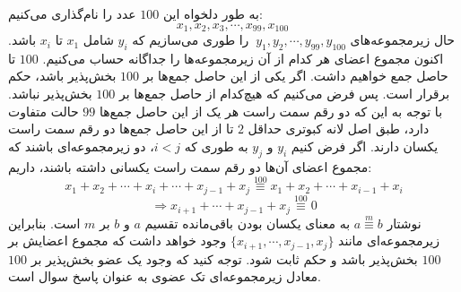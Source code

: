 \p
به طور دلخواه این 
$100$
 عدد را نام‌گذاری می‌کنیم:
$$x_1, x_2, x_3, \cdots, x_{99}, x_{100}\:$$
 حال زیرمجموعه‌های 
$\:y_1, y_2, \cdots, y_{99}, y_{100}$
 را طوری می‌سازیم که 
$y_i$
 شامل 
$x_1$
 تا
$x_i$
 باشد. اکنون مجموع اعضای هر کدام از آن زیرمجموعه‌ها را جداگانه حساب می‌کنیم.
 $100$
 تا حاصل جمع خواهیم داشت. اگر یکی از این حاصل جمع‌ها بر 
 $100$
 بخش‌پذیر باشد، حکم برقرار است. پس فرض می‌کنیم که هیچ‌کدام از حاصل جمع‌ها بر 
 $100$
 بخش‌پذیر نباشد. با توجه به این که دو رقم سمت راست هر یک از این حاصل جمع‌ها
 $99$
حالت متفاوت دارد، طبق اصل لانه کبوتری حداقل 
$2$
 تا از این  حاصل جمع‌ها دو رقم سمت راست یکسان دارند. اگر فرض کنیم
 $y_i$
 و
 $y_j$
 به طوری که
 $i < j$،
دو زیرمجموعه‌ای باشند که مجموع اعضای آن‌ها دو رقم سمت راست یکسانی داشته باشند، داریم:
  $$x_1 + x_2 + \cdots + x_i + \cdots + x_{j-1} + x_j\overset{100}{\equiv} x_1 + x_2 + \cdots + x_{i-1} + x_i$$
  $$\Rightarrow x_{i+1} + \cdots + x_{j-1} + x_j \overset{100}{\equiv} 0$$
  نوشتار
  $a\overset{m}{\equiv}b$
  به معنای یکسان بودن  باقی‌مانده تقسیم 
  $a$
  و
  $b$
  بر
  $m$
  است.
 \p
 بنابراین زیرمجموعه‌ای مانند
 $\{x_{i+1}, \cdots, x_{j-1}, x_j\}$
 وجود خواهد داشت که مجموع اعضایش بر
 $100$
 بخش‌پذیر باشد و حکم ثابت شود. توجه کنید که وجود یک عضو بخش‌پذیر بر
$100$ 
معادل زیرمجموعه‌ای تک عضوی به عنوان پاسخ سوال است.
 
 